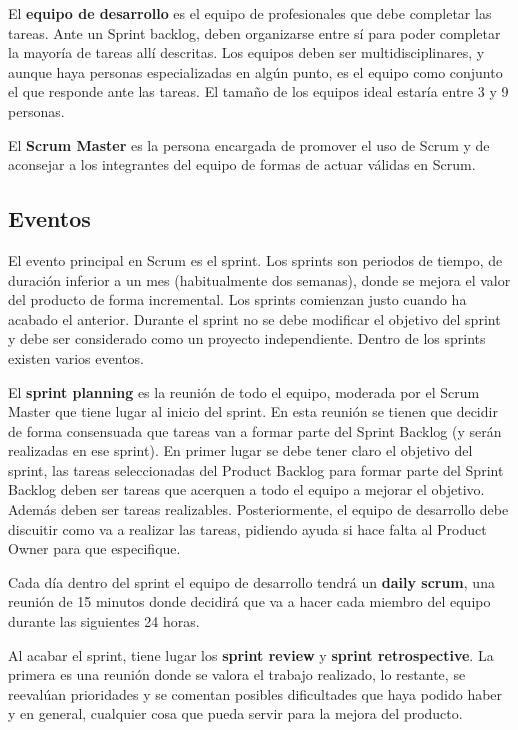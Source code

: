 \documentclass[12pt]{report} %
\begin{document}
El \textbf{equipo de desarrollo} es el equipo de profesionales que debe completar las tareas. Ante un Sprint backlog, deben organizarse entre sí para poder completar la mayoría de tareas allí descritas. Los equipos deben ser multidisciplinares, y aunque haya personas especializadas en algún punto, es el equipo como conjunto el que responde ante las tareas. El tamaño de los equipos ideal estaría entre 3 y 9 personas.

El \textbf{Scrum Master} es la persona encargada de promover el uso de Scrum y de aconsejar a los integrantes del equipo de formas de actuar válidas en Scrum.

\subsection{Eventos}

El evento principal en Scrum es el sprint. Los sprints son periodos de tiempo, de duración inferior a un mes (habitualmente dos semanas), donde se mejora el valor del producto de forma incremental. Los sprints comienzan justo cuando ha acabado el anterior. Durante el sprint no se debe modificar el objetivo del sprint y debe ser considerado como un proyecto independiente. Dentro de los sprints existen varios eventos.

El \textbf{sprint planning} es la reunión de todo el equipo, moderada por el Scrum Master que tiene lugar al inicio del sprint. En esta reunión se tienen que decidir de forma consensuada que tareas van a formar parte del Sprint Backlog (y serán realizadas en ese sprint). En primer lugar se debe tener claro el objetivo del sprint, las tareas seleccionadas del Product Backlog para formar parte del Sprint Backlog deben ser tareas que acerquen a todo el equipo a mejorar el objetivo. Además deben ser tareas realizables. Posteriormente, el equipo de desarrollo debe discuitir como va a realizar las tareas, pidiendo ayuda si hace falta al Product Owner para que especifique.

Cada día dentro del sprint el equipo de desarrollo tendrá un \textbf{daily scrum}, una reunión de 15 minutos donde decidirá que va a hacer cada miembro del equipo durante las siguientes 24 horas.

Al acabar el sprint, tiene lugar los \textbf{sprint review} y \textbf{sprint retrospective}. La primera es una reunión donde se valora el trabajo realizado, lo restante, se reevalúan prioridades y se comentan posibles dificultades que haya podido haber y en general, cualquier cosa que pueda servir para la mejora del producto.
\end{document}
